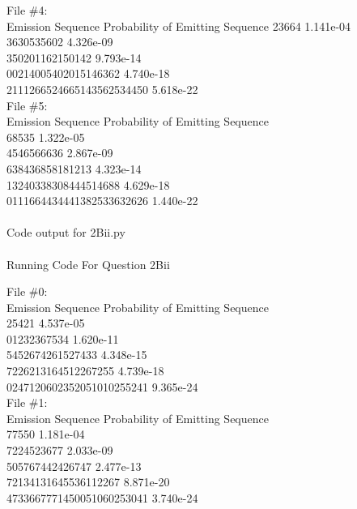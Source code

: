 \begin{subsolution}
{File \#4:\\
Emission Sequence             Probability of Emitting Sequence
23664                         1.141e-04\\
3630535602                    4.326e-09\\
350201162150142               9.793e-14\\
00214005402015146362          4.740e-18\\
2111266524665143562534450     5.618e-22\\


File \#5:\\
Emission Sequence             Probability of Emitting Sequence\\
68535                         1.322e-05\\
4546566636                    2.867e-09\\
638436858181213               4.323e-14\\
13240338308444514688          4.629e-18\\
0111664434441382533632626     1.440e-22\\
\\
Code output for 2Bii.py\\
\\
                    Running Code For Question 2Bii


File \#0:\\
Emission Sequence             Probability of Emitting Sequence\\
25421                         4.537e-05\\
01232367534                   1.620e-11\\
5452674261527433              4.348e-15\\
7226213164512267255           4.739e-18\\
0247120602352051010255241     9.365e-24\\


File \#1:\\
Emission Sequence             Probability of Emitting Sequence\\
77550                         1.181e-04\\
7224523677                    2.033e-09\\
505767442426747               2.477e-13\\
72134131645536112267          8.871e-20\\
4733667771450051060253041     3.740e-24\\


}
\end{subsolution}
